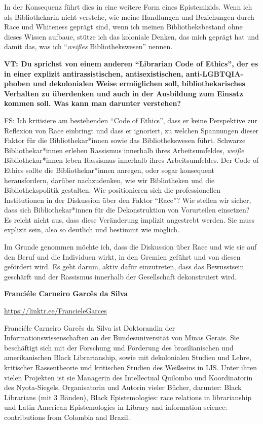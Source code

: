 \documentclass[a4paper,
fontsize=11pt,
oneside,
numbers=noperiodatend,
parskip=half-,
bibliography=totoc,
final
]{scrartcl}
\begin{document}
In der Konsequenz führt dies in eine weitere Form eines Epistemizids.
Wenn ich als Bibliothekarin nicht verstehe, wie meine Handlungen und
Beziehungen durch Race und Whiteness geprägt sind, wenn ich meinen
Bibliotheksbestand ohne dieses Wissen aufbaue, stütze ich das koloniale
Denken, das mich geprägt hat und damit das, was ich
\enquote{\emph{weißes} Bibliothekswesen} nennen.

\textbf{VT: Du sprichst von einem anderen \enquote{Librarian Code of
Ethics}, der es in einer explizit antirassistischen, antisexistischen,
anti-LGBTQIA-phoben und dekolonialen Weise ermöglichen soll,
bibliothekarisches Verhalten zu überdenken und auch in der Ausbildung
zum Einsatz kommen soll. Was kann man darunter verstehen?}

FS: Ich kritisiere am bestehenden \enquote{Code of Ethics}, dass er
keine Perspektive zur Reflexion von Race einbringt und dass er
ignoriert, zu welchen Spannungen dieser Faktor für die
Bibliothekar*innen sowie das Bibliothekswesen führt. Schwarze
Bibliothekar*innen erleben Rassismus innerhalb ihres Arbeitsumfeldes,
\emph{weiße} Bibliothekar*innen leben Rassismus innerhalb ihres
Arbeitsumfeldes. Der Code of Ethics sollte die Bibliothekar*innen
anregen, oder sogar konsequent herausfordern, darüber nachzudenken, wie
wir Bibliotheken und die Bibliothekspolitik gestalten. Wie positionieren
sich die professionellen Institutionen in der Diskussion über den Faktor
\enquote{Race}? Wie stellen wir sicher, dass sich Bibliothekar*innen für
die Dekonstruktion von Vorurteilen einsetzen? Es reicht nicht aus, dass
diese Veränderung implizit angestrebt werden. Sie muss explizit sein,
also so deutlich und bestimmt wie möglich.

Im Grunde genommen möchte ich, dass die Diskussion über Race und wie sie
auf den Beruf und die Individuen wirkt, in den Gremien geführt und von
diesen gefördert wird. Es geht darum, aktiv dafür einzutreten, dass das
Bewusstsein geschärft und der Rassismus innerhalb der Gesellschaft
dekonstruiert wird.

\textbf{Franciéle Carneiro Garcês da Silva}

\url{https://linktr.ee/FrancieleGarces}

Franciéle Carneiro Garcês da Silva ist Doktorandin der
Informationswissenschaften an der Bundesuniversität von Minas Gerais.
Sie beschäftigt sich mit der Forschung und Förderung des brasilianischen
und amerikanischen Black Librarianship, sowie mit dekolonialen Studien
und Lehre, kritischer Rassentheorie und kritischen Studien des Weißseins
in LIS. Unter ihren vielen Projekten ist sie Managerin des Intellectual
Quilombo und Koordinatorin des Nyota-Siegels, Organisatorin und Autorin
vieler Bücher, darunter: Black Librarians (mit 3 Bänden), Black
Epistemologies: race relations in librarianship und Latin American
Epistemologies in Library and information science: contributions from
Colombia and Brazil.
\end{document}
